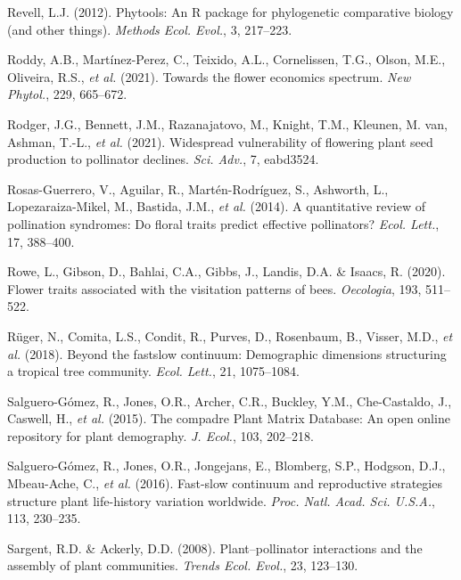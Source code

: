 \documentclass[
  12pt,
  a4paper,
]{article}
\newlength{\cslhangindent}
\newlength{\cslentryspacingunit} %
\newenvironment{CSLReferences}[2] %
 {%
  \setlength{\parindent}{0pt}
  \ifodd #1
  \let\oldpar\par
  \def\par{\hangindent=\cslhangindent\oldpar}
  \fi
  \setlength{\parskip}{#2\cslentryspacingunit}
 }%
 {}
\begin{document}
\begin{CSLReferences}{1}{0}
\leavevmode{}%
Revell, L.J. (2012). Phytools: An {R} package for phylogenetic comparative biology (and other things). \emph{Methods Ecol. Evol.}, 3, 217--223.

\leavevmode{}%
Roddy, A.B., Martínez-Perez, C., Teixido, A.L., Cornelissen, T.G., Olson, M.E., Oliveira, R.S., \emph{et al.} (2021). Towards the flower economics spectrum. \emph{New Phytol.}, 229, 665--672.

\leavevmode{}%
Rodger, J.G., Bennett, J.M., Razanajatovo, M., Knight, T.M., Kleunen, M. van, Ashman, T.-L., \emph{et al.} (2021). Widespread vulnerability of flowering plant seed production to pollinator declines. \emph{Sci. Adv.}, 7, eabd3524.

\leavevmode{}%
Rosas-Guerrero, V., Aguilar, R., Martén-Rodríguez, S., Ashworth, L., Lopezaraiza-Mikel, M., Bastida, J.M., \emph{et al.} (2014). A quantitative review of pollination syndromes: Do floral traits predict effective pollinators? \emph{Ecol. Lett.}, 17, 388--400.

\leavevmode{}%
Rowe, L., Gibson, D., Bahlai, C.A., Gibbs, J., Landis, D.A. \& Isaacs, R. (2020). Flower traits associated with the visitation patterns of bees. \emph{Oecologia}, 193, 511--522.

\leavevmode{}%
Rüger, N., Comita, L.S., Condit, R., Purves, D., Rosenbaum, B., Visser, M.D., \emph{et al.} (2018). Beyond the fast\textendash slow continuum: Demographic dimensions structuring a tropical tree community. \emph{Ecol. Lett.}, 21, 1075--1084.

\leavevmode{}%
Salguero-Gómez, R., Jones, O.R., Archer, C.R., Buckley, Y.M., Che-Castaldo, J., Caswell, H., \emph{et al.} (2015). The compadre {Plant Matrix Database}: An open online repository for plant demography. \emph{J. Ecol.}, 103, 202--218.

\leavevmode{}%
Salguero-Gómez, R., Jones, O.R., Jongejans, E., Blomberg, S.P., Hodgson, D.J., Mbeau-Ache, C., \emph{et al.} (2016). Fast-slow continuum and reproductive strategies structure plant life-history variation worldwide. \emph{Proc. Natl. Acad. Sci. U.S.A.}, 113, 230--235.

\leavevmode{}%
Sargent, R.D. \& Ackerly, D.D. (2008). Plant--pollinator interactions and the assembly of plant communities. \emph{Trends Ecol. Evol.}, 23, 123--130.


\end{CSLReferences}
\end{document}
